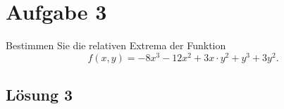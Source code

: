 \documentclass[main.tex]{subfiles}
\begin{document}
\section{Aufgabe 3}
Bestimmen Sie die relativen Extrema der Funktion
$$
    f(x,y) = -8x^3 -12x^2 +3x\cdot y^2 + y^3 +3y^2.
$$

\subsection{Lösung 3}
\end{document}
